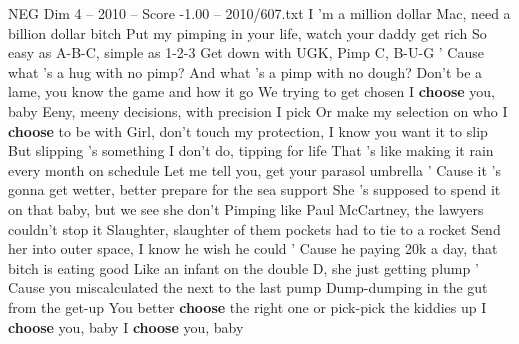 \begin{textsample}{NEG Dim 4 – 2010 – Score -1.00 – 2010/607.txt}
I 'm a million dollar Mac, need a billion dollar bitch Put my pimping in your life, watch your daddy get rich So easy as A-B-C, simple as 1-2-3 Get down with UGK, Pimp C, B-U-G ' Cause what 's a hug with no pimp?
And what 's a pimp with no dough?
Don't be a lame, you know the game and how it go We trying to get chosen I \textbf{choose} you, baby Eeny, meeny decisions, with precision I pick Or make my selection on who I \textbf{choose} to be with Girl, don't touch my protection, I know you want it to slip But slipping 's something I don't do, tipping for life That 's like making it rain every month on schedule Let me tell you, get your parasol umbrella ' Cause it 's gonna get wetter, better prepare for the sea support She 's supposed to spend it on that baby, but we see she don't Pimping like Paul McCartney, the lawyers couldn't stop it Slaughter, slaughter of them pockets had to tie to a rocket Send her into outer space, I know he wish he could ' Cause he paying 20k a day, that bitch is eating good Like an infant on the double D, she just getting plump ' Cause you miscalculated the next to the last pump Dump-dumping in the gut from the get-up You better \textbf{choose} the right one or pick-pick the kiddies up I \textbf{choose} you, baby I \textbf{choose} you, baby

\end{textsample}
